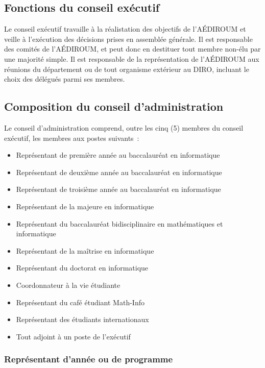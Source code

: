 \documentclass{aediroum}
\begin{document}
\subsection{Fonctions du conseil exécutif}\label{sec:fonctions-du-conseil-executif}

Le conseil exécutif travaille à la réalistation des objectifs de l'AÉDIROUM et veille à l'exécution des décisions prises en assemblée générale. Il est responsable des comités de l'AÉDIROUM, et peut donc en destituer tout membre non-élu par une majorité simple. Il est responsable de la représentation de l'AÉDIROUM aux réunions du département ou de tout organisme extérieur au DIRO, incluant le choix des délégués parmi ses membres.

\subsection{Composition du conseil d'administration}\label{sec:composition-du-conseil-dadministration}

Le conseil d'administration comprend, outre les cinq (5) membres du conseil exécutif, les membres aux postes suivants~:
\begin{itemize}
\item Représentant de première année au baccalauréat en informatique
\item Représentant de deuxième année au baccalauréat en informatique
\item Représentant de troisième année au baccalauréat en informatique
\item Représentant de la majeure en informatique
\item Représentant du baccalauréat bidisciplinaire en mathématiques et informatique
\item Représentant de la maîtrise en informatique
\item Représentant du doctorat en informatique
\item Coordonnateur à la vie étudiante
\item Représentant du café étudiant Math-Info
\item Représentant des étudiants internationaux
\item Tout adjoint à un poste de l'exécutif
\end{itemize}

\subsubsection{Représentant d'année ou de programme}\label{sec:representant-dannee-ou-de-programme}
\end{document}
